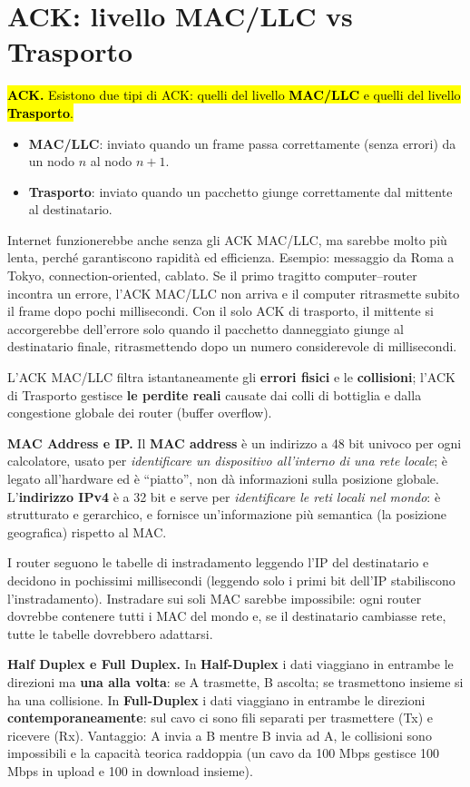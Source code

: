 \documentclass[11pt,a4paper]{report}
\newcommand{\pagemark}[1]{\marginpar{\footnotesize\color{gray}p.#1}}
\begin{document}
\section{ACK: livello MAC/LLC vs Trasporto}\pagemark{15}
\hl{\textbf{ACK.} Esistono due tipi di ACK: quelli del livello \textbf{MAC/LLC} e quelli del livello \textbf{Trasporto}.
}\begin{itemize}[noitemsep]
\item \textbf{MAC/LLC}: inviato quando un frame passa correttamente (senza errori) da un nodo $n$ al nodo $n+1$.
\item \textbf{Trasporto}: inviato quando un pacchetto giunge correttamente dal mittente al destinatario.
\end{itemize}
Internet funzionerebbe anche senza gli ACK MAC/LLC, ma sarebbe molto più lenta, perché garantiscono rapidità ed efficienza. Esempio: messaggio da Roma a Tokyo, connection-oriented, cablato. Se il primo tragitto computer--router incontra un errore, l'ACK MAC/LLC non arriva e il computer ritrasmette subito il frame dopo pochi millisecondi. Con il solo ACK di trasporto, il mittente si accorgerebbe dell'errore solo quando il pacchetto danneggiato giunge al destinatario finale, ritrasmettendo dopo un numero considerevole di millisecondi.

L'ACK MAC/LLC filtra istantaneamente gli \textbf{errori fisici} e le \textbf{collisioni}; l'ACK di Trasporto gestisce \textbf{le perdite reali} causate dai colli di bottiglia e dalla congestione globale dei router (buffer overflow).

\textbf{MAC Address e IP.} Il \textbf{MAC address} è un indirizzo a 48 bit univoco per ogni calcolatore, usato per \emph{identificare un dispositivo all'interno di una rete locale}; è legato all'hardware ed è ``piatto'', non dà informazioni sulla posizione globale. L'\textbf{indirizzo IPv4} è a 32 bit e serve per \emph{identificare le reti locali nel mondo}: è strutturato e gerarchico, e fornisce un'informazione più semantica (la posizione geografica) rispetto al MAC.

I router seguono le tabelle di instradamento leggendo l'IP del destinatario e decidono in pochissimi millisecondi (leggendo solo i primi bit dell'IP stabiliscono l'instradamento). Instradare sui soli MAC sarebbe impossibile: ogni router dovrebbe contenere tutti i MAC del mondo e, se il destinatario cambiasse rete, tutte le tabelle dovrebbero adattarsi.

\textbf{Half Duplex e Full Duplex.} In \textbf{Half-Duplex} i dati viaggiano in entrambe le direzioni ma \textbf{una alla volta}: se A trasmette, B ascolta; se trasmettono insieme si ha una collisione. In \textbf{Full-Duplex} i dati viaggiano in entrambe le direzioni \textbf{contemporaneamente}: sul cavo ci sono fili separati per trasmettere (Tx) e ricevere (Rx). Vantaggio: A invia a B mentre B invia ad A, le collisioni sono impossibili e la capacità teorica raddoppia (un cavo da 100 Mbps gestisce 100 Mbps in upload e 100 in download insieme).
\end{document}
